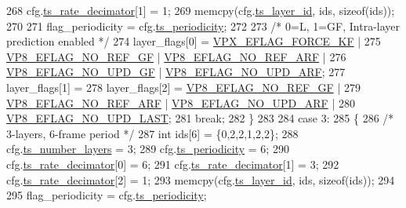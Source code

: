 \begin{DoxyCodeInclude}
{{{{{{{{{{{{{{{268         cfg.\hyperlink{structvpx__codec__enc__cfg_ad40c30846ef8ef1d8684f10a491ec535}{ts\_rate\_decimator}[1] = 1;
269         memcpy(cfg.\hyperlink{structvpx__codec__enc__cfg_a4d105d2470dbfb7210b33d298f1cf1f6}{ts\_layer\_id}, ids, \textcolor{keyword}{sizeof}(ids));
270 
271         flag\_periodicity = cfg.\hyperlink{structvpx__codec__enc__cfg_a4ec338780115dd270acf0dac24193474}{ts\_periodicity};
272 
273         \textcolor{comment}{/* 0=L, 1=GF, Intra-layer prediction enabled */}
274         layer\_flags[0] = \hyperlink{group__encoder_ga4c4f4e3cbb5225d2c6c050e2d1e948fa}{VPX\_EFLAG\_FORCE\_KF}  |
275                          \hyperlink{group__vp8__encoder_gabb5e95343a2738abef44eca13059da33}{VP8\_EFLAG\_NO\_REF\_GF} | 
      \hyperlink{group__vp8__encoder_ga650ab0baea12be91082226a5cc18776a}{VP8\_EFLAG\_NO\_REF\_ARF} |
276                          \hyperlink{group__vp8__encoder_gab01d066c5236457d345ce1cab4c41d6b}{VP8\_EFLAG\_NO\_UPD\_GF} | 
      \hyperlink{group__vp8__encoder_ga1cff46a5287e73a620660030d40b9e6c}{VP8\_EFLAG\_NO\_UPD\_ARF};
277         layer\_flags[1] =
278         layer\_flags[2] = \hyperlink{group__vp8__encoder_gabb5e95343a2738abef44eca13059da33}{VP8\_EFLAG\_NO\_REF\_GF}  |
279                          \hyperlink{group__vp8__encoder_ga650ab0baea12be91082226a5cc18776a}{VP8\_EFLAG\_NO\_REF\_ARF} | 
      \hyperlink{group__vp8__encoder_ga1cff46a5287e73a620660030d40b9e6c}{VP8\_EFLAG\_NO\_UPD\_ARF} |
280                                                 \hyperlink{group__vp8__encoder_ga602edb6b02a89cb2db7a16d6dffba583}{VP8\_EFLAG\_NO\_UPD\_LAST};
281         \textcolor{keywordflow}{break};
282     \}
283 
284     \textcolor{keywordflow}{case} 3:
285     \{
286         \textcolor{comment}{/* 3-layers, 6-frame period */}
287         \textcolor{keywordtype}{int} ids[6] = \{0,2,2,1,2,2\};
288         cfg.\hyperlink{structvpx__codec__enc__cfg_a16d4549a30cbd585e3c3056ef873d8c7}{ts\_number\_layers}     = 3;
289         cfg.\hyperlink{structvpx__codec__enc__cfg_a4ec338780115dd270acf0dac24193474}{ts\_periodicity}       = 6;
290         cfg.\hyperlink{structvpx__codec__enc__cfg_ad40c30846ef8ef1d8684f10a491ec535}{ts\_rate\_decimator}[0] = 6;
291         cfg.\hyperlink{structvpx__codec__enc__cfg_ad40c30846ef8ef1d8684f10a491ec535}{ts\_rate\_decimator}[1] = 3;
292         cfg.\hyperlink{structvpx__codec__enc__cfg_ad40c30846ef8ef1d8684f10a491ec535}{ts\_rate\_decimator}[2] = 1;
293         memcpy(cfg.\hyperlink{structvpx__codec__enc__cfg_a4d105d2470dbfb7210b33d298f1cf1f6}{ts\_layer\_id}, ids, \textcolor{keyword}{sizeof}(ids));
294 
295         flag\_periodicity = cfg.\hyperlink{structvpx__codec__enc__cfg_a4ec338780115dd270acf0dac24193474}{ts\_periodicity};
}}}}}}}}}}}}}}}
\end{DoxyCodeInclude}
